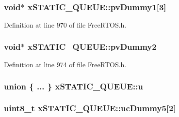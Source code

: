 \subsubsection[{\texorpdfstring{pv\+Dummy1}{pvDummy1}}]{\setlength{\rightskip}{0pt plus 5cm}void$\ast$ x\+S\+T\+A\+T\+I\+C\+\_\+\+Q\+U\+E\+U\+E\+::pv\+Dummy1\mbox{[}3\mbox{]}}\hypertarget{structx_s_t_a_t_i_c___q_u_e_u_e_aacf22a66a8d723648995692ec77ee416}{}\label{structx_s_t_a_t_i_c___q_u_e_u_e_aacf22a66a8d723648995692ec77ee416}


Definition at line 970 of file Free\+R\+T\+O\+S.\+h.

\subsubsection[{\texorpdfstring{pv\+Dummy2}{pvDummy2}}]{\setlength{\rightskip}{0pt plus 5cm}void$\ast$ x\+S\+T\+A\+T\+I\+C\+\_\+\+Q\+U\+E\+U\+E\+::pv\+Dummy2}\hypertarget{structx_s_t_a_t_i_c___q_u_e_u_e_adb72a02b22a558f6fad381d65af5ac68}{}\label{structx_s_t_a_t_i_c___q_u_e_u_e_adb72a02b22a558f6fad381d65af5ac68}


Definition at line 974 of file Free\+R\+T\+O\+S.\+h.

\subsubsection[{\texorpdfstring{u}{u}}]{\setlength{\rightskip}{0pt plus 5cm}union \{ ... \}   x\+S\+T\+A\+T\+I\+C\+\_\+\+Q\+U\+E\+U\+E\+::u}\hypertarget{structx_s_t_a_t_i_c___q_u_e_u_e_a8a896145a0d9376a7e2713afdd782c41}{}\label{structx_s_t_a_t_i_c___q_u_e_u_e_a8a896145a0d9376a7e2713afdd782c41}
\subsubsection[{\texorpdfstring{uc\+Dummy5}{ucDummy5}}]{\setlength{\rightskip}{0pt plus 5cm}uint8\+\_\+t x\+S\+T\+A\+T\+I\+C\+\_\+\+Q\+U\+E\+U\+E\+::uc\+Dummy5\mbox{[}2\mbox{]}}\hypertarget{structx_s_t_a_t_i_c___q_u_e_u_e_a541c5044376603540cc3c9cabcbdc5e6}{}\label{structx_s_t_a_t_i_c___q_u_e_u_e_a541c5044376603540cc3c9cabcbdc5e6}


